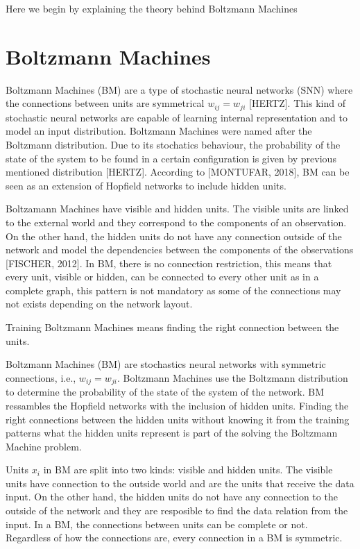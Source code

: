 Here we begin by explaining the theory behind Boltzmann Machines

\section{Boltzmann Machines}

Boltzmann Machines (BM) are a type of stochastic neural networks (SNN) where the connections between units are symmetrical $w_{ij} = w_{ji}$ [HERTZ]. This kind of stochastic neural networks are capable of learning internal representation and to model an input distribution. Boltzmann Machines were named after the Boltzmann distribution. Due to its stochatics behaviour, the probability of the state of the system to be found in a certain configuration is given by previous mentioned distribution [HERTZ]. According to [MONTUFAR, 2018], BM can be seen as an extension of Hopfield networks to include hidden units.


Boltzamann Machines have visible and hidden units. The visible units are linked to the external world and they correspond to the components of an observation. On the other hand, the hidden units do not have any connection outside of the network and model the dependencies between the components of the observations [FISCHER, 2012]. In BM, there is no connection restriction, this means that every unit, visible or hidden, can be connected to every other unit as in a complete graph, this pattern is not mandatory as some of the connections may not exists depending on the network layout.

Training Boltzmann Machines means finding the right connection between the units.


Boltzmann Machines (BM) are stochastics neural networks with symmetric connections, i.e., $w_{ij} = w_{ji}$. Boltzmann Machines use the Boltzmann distribution to determine the probability of the state of the system of the network. BM ressambles the Hopfield networks with the inclusion of hidden units. Finding the right connections between the hidden units without knowing it from the training patterns what the hidden units represent is part of the solving the Boltzmann Machine problem.

Units $x_{i}$ in BM are split into two kinds: visible and hidden units. The visible units have connection to the outside world and are the units that receive the data input. On the other hand, the hidden units do not have any connection to the outside of the network and they are resposible to find the data relation from the input. In a BM, the connections between units can be complete or not. Regardless of how the connections are, every connection in a BM is symmetric.

